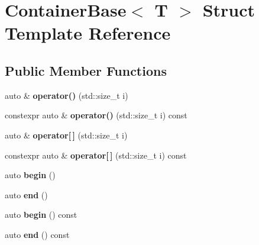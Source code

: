 \hypertarget{structContainerBase}{}\section{Container\+Base$<$ T $>$ Struct Template Reference}
\label{structContainerBase}
\subsection*{Public Member Functions}
\begin{DoxyCompactItemize}
\item 
\mbox{\label{structContainerBase_a36863f426649fe209bdb8459861f77aa}} 
auto \& {\bfseries operator()} (std\+::size\+\_\+t i)
\item 
\mbox{\label{structContainerBase_a6bd5fceec65901efbef4e4080e9b803a}} 
constexpr auto \& {\bfseries operator()} (std\+::size\+\_\+t i) const
\item 
\mbox{\label{structContainerBase_a97b23eefaf74d425031f4a6e38fb3e52}} 
auto \& {\bfseries operator\mbox{[}$\,$\mbox{]}} (std\+::size\+\_\+t i)
\item 
\mbox{\label{structContainerBase_aedf8882ba2cccd9dd3913b50e1ab56e2}} 
constexpr auto \& {\bfseries operator\mbox{[}$\,$\mbox{]}} (std\+::size\+\_\+t i) const
\item 
\mbox{\label{structContainerBase_a5b2e85411107281947091c419affa761}} 
auto {\bfseries begin} ()
\item 
\mbox{\label{structContainerBase_a33b0e3d4bda02de8dce699c1cb1813e6}} 
auto {\bfseries end} ()
\item 
\mbox{\label{structContainerBase_ade415cd17e3385d04188c28c673fe275}} 
auto {\bfseries begin} () const
\item 
\mbox{\label{structContainerBase_a27bd2d66c75e7f9e387bced476105b37}} 
auto {\bfseries end} () const
\item 
\mbox{\label{structContainerBase_aee5c1554129dc52b7ae87f411276b9fe}} 

\end{DoxyCompactItemize}
